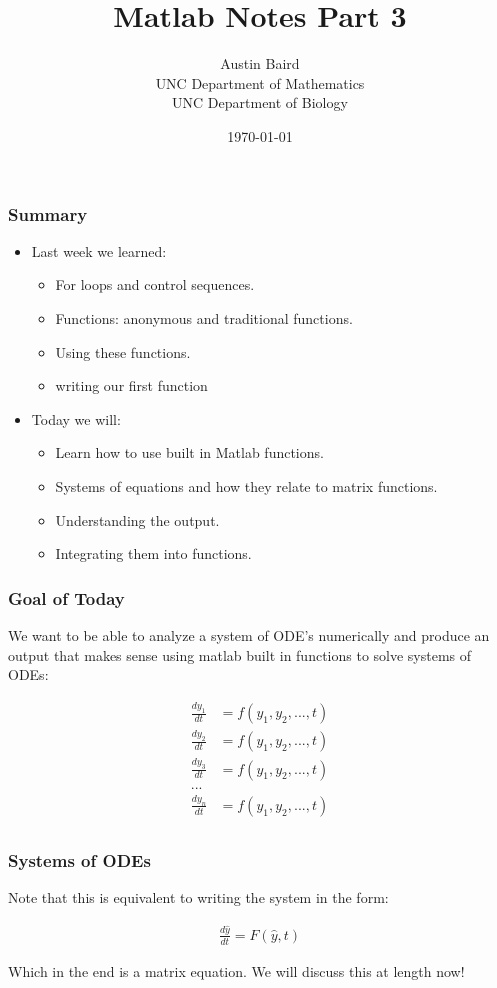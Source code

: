 \documentclass{beamer}
\title{ Matlab Notes Part 3}
\author{Austin Baird\\UNC Department of Mathematics\\UNC Department of Biology}
\date{\today}
\begin{document}
\frame{\titlepage}

\begin{frame}
\frametitle{Summary}
\begin{itemize}

\item Last week we learned: 
\begin{itemize}
\item For loops and control sequences.
\item Functions: anonymous and traditional functions.
\item Using these functions. 
\item writing our first function 
\end{itemize}
\item Today we will: 
\begin{itemize}
\item Learn how to use built in Matlab functions.
\item Systems of equations and how they relate to matrix functions.  
\item Understanding the output.
\item Integrating them into functions.
\end{itemize}
\end{itemize}

\end{frame}

\begin{frame}
\frametitle{Goal of Today} 

We want to be able to analyze a system of ODE's numerically and produce an output that makes sense using matlab built in functions to solve systems of ODEs: 

\begin{align*}
\frac{dy_1}{dt} &= f(y_1,y_2,...,t)\\
\frac{dy_2}{dt} &= f(y_1,y_2,...,t)\\
\frac{dy_3}{dt} &= f(y_1,y_2,...,t)\\
...\\
\frac{dy_n}{dt} &= f(y_1,y_2,...,t)\\
\end{align*}


\end{frame}
%
\begin{frame}
\frametitle{Systems of ODEs}

Note that this is equivalent to writing the system in the form: 

{\LARGE
\begin{align*}
\frac{d\hat{y}}{dt} = F(\hat{y},t)
\end{align*}
}

Which in the end is a matrix equation. We will discuss this at length now! 
\end{frame}
\end{document}

